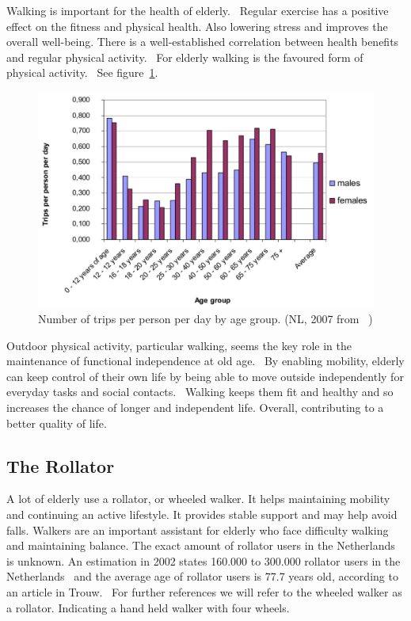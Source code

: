 Walking is important for the health of elderly.~\cite{Borst2008} Regular exercise has a positive effect on the fitness and physical health. Also lowering stress and improves the overall well-being. There is a well-established correlation between health benefits and regular physical activity.~\cite{Annear2014} For elderly walking is the favoured form of physical activity.~\cite{Borst2008} See figure~\ref{percwalk}.

\begin{figure}[h]
\includegraphics[width=\textwidth]{img/I_numberOfTripsPerPersonPerDayByAge.pdf}
\centering
\caption[Number of trips per person per day by age group]{
Number of trips per person per day by age group. (NL, 2007 from ~\cite{countryReport}) \label{percwalk}}
\end{figure}

Outdoor physical activity, particular walking, seems the key role in the maintenance of functional independence at old age.~\cite{Rantakokko2009} By enabling mobility, elderly can keep control of their own life by being able to move outside independently for everyday tasks and social contacts.~\cite{MENSenSTRAAT2014} Walking keeps them fit and healthy and so increases the chance of longer and independent life. Overall, contributing to a better quality of life. 

\subsection{The Rollator}
A lot of elderly use a rollator, or wheeled walker. It helps maintaining mobility and continuing an active lifestyle. It provides stable support and may help avoid falls. Walkers are an important assistant for elderly who face difficulty walking and maintaining balance. The exact amount of rollator users in the Netherlands is unknown. An estimation in 2002 states 160.000 to 300.000 rollator users in the Netherlands~\cite{VeiligheidNL2012} and the average age of rollator users is 77.7 years old, according to an article in Trouw.~\cite{Trouw2003} 
For further references we will refer to the wheeled walker as a rollator. Indicating a hand held walker with four wheels.  


